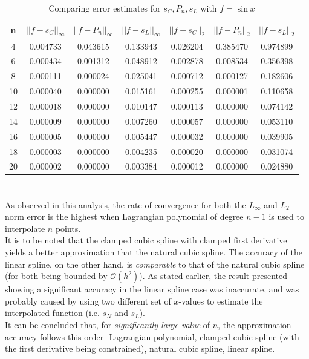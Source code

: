 \documentclass[12pt]{article}
\begin{document}
\begin{table}[h]
    \centering
    \begin{tabular}{|c|c|c|c|c|c|c|}
        \hline
        n & $||f-s_C||_\infty$ & $||f-P_n||_\infty$ & $||f-s_L||_\infty$
        & $||f-s_C||_2$ & $||f-P_n||_2$ & $||f-s_L||_2$\\
        \hline \hline
        4 & 0.004733 & 0.043615 & 0.133943 & 0.026204 & 0.385470 & 0.974899\\ 
        \hline 
        6 & 0.000434 & 0.001312 & 0.048912 & 0.002878 & 0.008534 & 0.356398\\ 
        \hline 
        8 & 0.000111 & 0.000024 & 0.025041 & 0.000712 & 0.000127 & 0.182606\\ 
        \hline 
        10 & 0.000040 & 0.000000 & 0.015161 & 0.000255 & 0.000001 & 0.110658\\ 
        \hline 
        12 & 0.000018 & 0.000000 & 0.010147 & 0.000113 & 0.000000 & 0.074142\\ 
        \hline 
        14 & 0.000009 & 0.000000 & 0.007260 & 0.000057 & 0.000000 & 0.053110\\ 
        \hline 
        16 & 0.000005 & 0.000000 & 0.005447 & 0.000032 & 0.000000 & 0.039905\\ 
        \hline 
        18 & 0.000003 & 0.000000 & 0.004235 & 0.000020 & 0.000000 & 0.031074\\ 
        \hline 
        20 & 0.000002 & 0.000000 & 0.003384 & 0.000012 & 0.000000 & 0.024880\\ 
        \hline 
    \end{tabular}
    \caption{Comparing error estimates for $s_C, P_n, s_L$ with $f = \sin x$}
\end{table}

\section{\color{violet}{Conclusion}}
As observed in this analysis, the rate of convergence for both the $L_\infty$ and $L_2$ norm error is the highest when Lagrangian polynomial of degree $n-1$ is used to interpolate $n$ points.\\
It is to be noted that the clamped cubic spline with clamped first derivative yields a better approximation that the natural cubic spline. The accuracy of the linear spline, on the other hand, is \emph{comparable} to that of the natural cubic spline (for both being bounded by $\mathcal{O}(h^2)$). As stated earlier, the result presented showing a significant accuracy in the linear spline case was inaccurate, and was probably caused by using two different set of $x$-values to estimate the interpolated function (i.e. $s_N$ and $s_L$).\\
It can be concluded that, for \emph{significantly large value} of $n$, the approximation accuracy follows this order- Lagrangian polynomial, clamped cubic spline (with the first derivative being constrained), natural cubic spline, linear spline.
\end{document}
